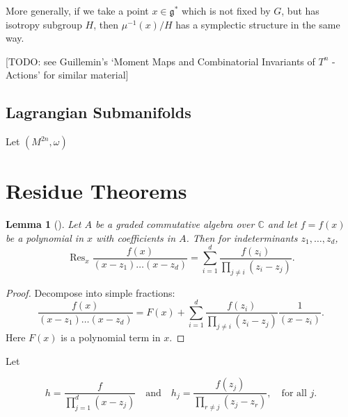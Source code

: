 \documentclass{article}
\newtheorem{lemma}[theorem]{Lemma}
\newcommand{\w}{\omega}
\newcommand{\CC}{\mathbb{C}}
\newcommand{\mfg}{\mathfrak{g}}
\DeclareMathOperator{\Res}{Res}
\begin{document}
	More generally, if we take a point $x \in \mfg^{\ast}$ which is not fixed by $G$, but has isotropy subgroup $H$, then $\mu^{-1}(x)/H$ has a symplectic structure in the same way.
	
	[TODO: see Guillemin's `Moment Maps and Combinatorial Invariants of $T^{n}$ -Actions' for similar material]
	
	\subsection{Lagrangian Submanifolds}
	
	Let $(M^{2n}, \w)$ 
	
	
	
	
	
	
	
	
	
	
	
	
	
	
	
	
	
	
	
	
	\section{Residue Theorems}
	
	\begin{lemma}[\cite{Guillemin1999}]\label{residue:1}
		Let $A$ be a graded commutative algebra over $\CC$ and let $f = f(x)$ be a polynomial in $x$ with coefficients in $A$. Then for indeterminants $z_{1}, \ldots, z_{d}$,
		\begin{equation*}
			\Res_{x} \frac{f(x)}{(x - z_{1})\ldots(x - z_{d})} = \sum\limits_{i = 1}^{d}\frac{f(z_{i})}{\prod_{j \neq i}(z_{i} - z_{j})}.
		\end{equation*}
	\end{lemma}
	
	\begin{proof}
		Decompose into simple fractions:
		\begin{equation*}
			\frac{f(x)}{(x - z_{1})\ldots(x - z_{d})} = F(x) + \sum\limits_{i = 1}^{d} \frac{f(z_{i})}{\prod_{j \neq i} (z_{i} - z_{j})} \frac{1}{(x - z_{i})}.
		\end{equation*}
		Here $F(x)$ is a polynomial term in $x$.
	\end{proof}
	
	Let
	
	\begin{equation*}
		h = \frac{f}{ \prod_{j = 1}^{d}(x - z_{j}) } \quad \text{and} \quad h_{j} = \frac{f(z_{j})}{\prod_{r \neq j}(z_{j} - z_{r})}, \quad \text{for all } j.
	\end{equation*}
	
\end{document}
